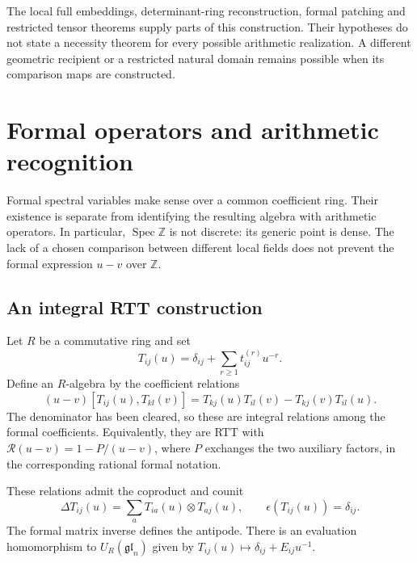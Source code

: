 The local full embeddings, determinant-ring reconstruction,
formal patching and restricted tensor theorems supply parts of
this construction. Their hypotheses do not state a necessity
theorem for every possible arithmetic realization.
A different geometric recipient or a restricted natural domain
remains possible when its comparison maps are constructed.


\section{Formal operators and arithmetic recognition}
\label{v4-arith:ic:formal-operators}

Formal spectral variables make sense over a common coefficient ring.
Their existence is separate from identifying the resulting algebra
with arithmetic operators.
In particular, \(\operatorname{Spec}\mathbb Z\) is not discrete:
its generic point is dense.
The lack of a chosen comparison between different local fields
does not prevent the formal expression \(u-v\) over \(\mathbb Z\).

\subsection{An integral RTT construction}

Let \(R\) be a commutative ring and set
\[
 T_{ij}(u)=\delta_{ij}+\sum_{r\ge1}t_{ij}^{(r)}u^{-r}.
\]
Define an \(R\)-algebra by the coefficient relations
\[
 (u-v)[T_{ij}(u),T_{kl}(v)]
  =T_{kj}(u)T_{il}(v)-T_{kj}(v)T_{il}(u).
\]
The denominator has been cleared, so these are integral relations
among the formal coefficients.
Equivalently, they are RTT with
\(\mathcal R(u-v)=1-P/(u-v)\), where \(P\) exchanges the two
auxiliary factors, in the corresponding rational formal notation.

\begin{proposition}\label{v4-arith:ic:rtt}
These relations admit the coproduct and counit
\[
 \Delta T_{ij}(u)=\sum_aT_{ia}(u)\otimes T_{aj}(u),
 \qquad \epsilon(T_{ij}(u))=\delta_{ij}.
\]
The formal matrix inverse defines the antipode.
There is an evaluation homomorphism to
\(U_R(\mathfrak{gl}_n)\) given by
\(T_{ij}(u)\mapsto\delta_{ij}+E_{ij}u^{-1}\).
\end{proposition}


